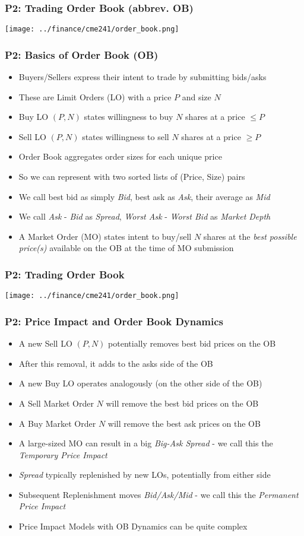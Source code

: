 \documentclass[handout]{beamer}
\begin{document}
\begin{frame}
\frametitle{P2: Trading Order Book (abbrev. OB)}
\texttt{[image: ../finance/cme241/order\_book.png]}
\end{frame}

\begin{frame}
\frametitle{P2: Basics of Order Book (OB)}
\pause
\begin{itemize}[<+->]
\item Buyers/Sellers express their intent to trade by submitting bids/asks
\item These are Limit Orders (LO) with a price $P$ and size $N$
\item Buy LO $(P, N)$ states willingness to buy $N$ shares at a price $\leq P$
\item Sell  LO $(P, N)$ states willingness to sell $N$ shares at a price $\geq P$
\item Order Book aggregates order sizes for each unique price
\item So we can represent with two sorted lists of (Price, Size) pairs
\item We call best bid as simply {\em Bid}, best ask as {\em Ask}, their average as {\em Mid}
\item We call {\em Ask} - {\em Bid} as {\em Spread}, {\em Worst Ask} - {\em Worst Bid} as {\em Market Depth}
\item A Market Order (MO) states intent to buy/sell $N$ shares at the {\em best possible price(s)} available on the OB at the time of MO submission
\end{itemize}
\end{frame}

\begin{frame}
\frametitle{P2: Trading Order Book}
\texttt{[image: ../finance/cme241/order\_book.png]}
\end{frame}

\begin{frame}
\frametitle{P2: Price Impact and Order Book Dynamics}
\pause
\begin{itemize}[<+->]
\item A new Sell LO $(P,N)$ potentially removes best bid prices on the OB
\item After this removal, it adds to the asks side of the OB 
\item A new Buy LO operates analogously (on the other side of the OB)
\item A Sell Market Order $N$ will remove the best bid prices on the OB
\item A Buy Market Order $N$ will remove the best ask prices on the OB
\item A large-sized MO can result in a big {\em Big-Ask Spread} - we call this the {\em Temporary Price Impact}
\item {\em Spread} typically replenished by new LOs, potentially from either side
\item Subsequent Replenishment moves {\em Bid/Ask/Mid} - we call this the {\em Permanent Price Impact}
\item Price Impact Models with OB Dynamics can be quite complex
\end{itemize}
\end{frame}
\end{document}
